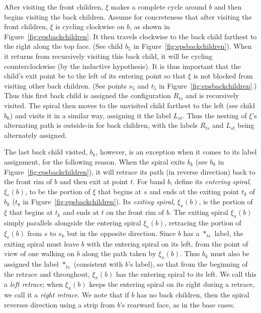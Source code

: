 \documentclass[11pt]{article}
\def\nothing{\ast}
\begin{document}
After visiting the front children, $\xi$ makes a complete cycle around $b$ and
then begins visiting the back children. Assume for concreteness that after visiting the
front children, $\xi$ is cycling clockwise on $b$, as shown in Figure~\ref{fig:epsbackchildren}. It then travels clockwise to the back child farthest to the right
along the top face. (See child $b_5$ in Figure~\ref{fig:epsbackchildren}).
When it returns from recursively visiting this back child, it will be cycling counterclockwise
(by the inductive hypothesis).
It is thus important that the child's exit point be to the left
of its entering point so that $\xi$ is not blocked from visiting other back children.
(See points $s_5$ and $t_5$ in Figure~\ref{fig:epsbackchildren}.)
Thus this first back child is assigned the configuration $R_{ts}$ and is recursively visited.  The spiral then moves to the unvisited child
farthest to the left
(see child $b_6$) and visits it in a similar way, assigning it the label $L_{st}$.
Thus the nesting of $\xi$'s alternating path is outside-in for back children,
with the labels $R_{ts}$ and $L_{st}$ being alternately assigned.


The last back child visited, $b_k$, however, is an exception when it comes to
its label assignment, for the following reason.
When the spiral exits $b_k$ (see $b_{8}$ in Figure~\ref{fig:epsbackchildren}),
it will retrace its path (in reverse direction) back
to the front rim of $b$ and then exit at point $t$.
For band $b$,  define its \emph{entering spiral}, $\xi_e(b)$, to be the portion of $\xi$ that begins
at $s$ and ends at the exiting point $t_k$ of $b_k$
($t_{8}$ in Figure~\ref{fig:epsbackchildren}).
Its \emph{exiting spiral}, $\xi_x(b)$, is the portion of $\xi$ that
begins at $t_k$
and ends at $t$ on the front rim of $b$.
The exiting spiral $\xi_x(b)$ simply parallels alongside the
entering spiral $\xi_e(b)$,
retracing the portion of $\xi_e(b)$ from $s$ to $s_k$ but in the opposite direction.
Since $b$ has a $\nothing_{ts}$ label, the exiting spiral must leave $b$ with the entering
spiral on its left, from the point of view of one walking on $b$
along the path taken by $\xi_x(b)$. Thus $b_k$
must also be assigned the label $\nothing_{ts}$ (consistent
with  $b$'s label), so that from the beginning of the retrace and throughout, $\xi_x(b)$ has
the entering spiral to its left. We call this a \emph{left retrace}; when $\xi_x(b)$ keeps
the entering spiral on its right during a retrace, we call it a \emph{right retrace}.
We note that if $b$ has no back children,
then the spiral reverses direction using a strip from $b$'s rearward face, as in
the base cases.
\end{document}
